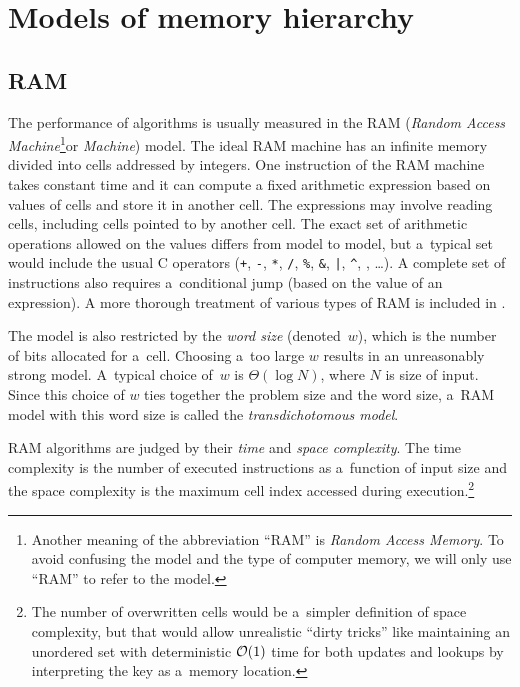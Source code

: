 \chapter{Models of memory hierarchy}
\label{chapter:models}
\section{RAM}

The performance of algorithms is usually measured in the RAM
(\emph{Random Access Machine}\footnote{%
	Another meaning of the abbreviation ``RAM'' is \emph{Random Access
	Memory}. To avoid confusing the model and the type of computer memory,
	we will only use ``RAM'' to refer to the model.
}or \emph{Machine}) model.
The ideal RAM machine has an infinite memory divided into cells addressed
by integers.
One instruction of the RAM machine takes constant time and it
can compute a fixed arithmetic expression based on values of cells and store it
in another cell. The expressions may involve reading cells, including cells
pointed to by another cell. The exact set of arithmetic operations allowed
on the values differs from model to model, but a~typical set would include
the usual C operators (\texttt{+}, \texttt{-}, \texttt{*}, \texttt{/},
\texttt{\%}, \texttt{\&}, \texttt{|}, \texttt{\^},
\texttt{\raisebox{0.5ex}{\texttildelow}},
\dots).  A complete set of instructions also requires a~conditional jump (based
on the value of an expression).
A more thorough treatment of various types of RAM is included
in \cite{saga-of-msts}.

The model is also restricted by the \textit{word size} (denoted~$w$),
which is the number of bits allocated for a~cell. Choosing a~too large $w$
results in an unreasonably strong model. A~typical choice of~$w$ is
$\Theta(\log N)$, where $N$ is size of input.
Since this choice of $w$ ties together the problem size and the word size,
a~RAM model with this word size is called the \textit{transdichotomous model}.

RAM algorithms are judged by their \emph{time} and \emph{space complexity}.
The time complexity is the number of executed instructions as a~function of
input size and the space complexity is the maximum cell index accessed during
execution.\footnote{%
	The number of overwritten cells would be a~simpler definition
	of space complexity, but that would allow unrealistic ``dirty tricks''
	like maintaining an unordered set with deterministic $\mathcal{O}(1)$ time
	for both updates and lookups by interpreting the key as a~memory
	location.
}

